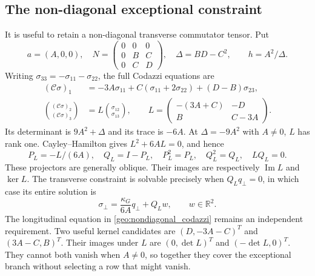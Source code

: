 \subsection{The non-diagonal exceptional constraint}
\label{geo:exceptional_full}
It is useful to retain a non-diagonal transverse commutator tensor. Put
\begin{equation}
 a=(A,0,0),\quad N=\begin{pmatrix}0&0&0\\0&B&C\\0&C&D\end{pmatrix},\quad
 \Delta=BD-C^2,\qquad h=A^2/\Delta.
 \label{geo:nondiagonal_structure}
\end{equation}
Writing $\sigma_{33}=-\sigma_{11}-\sigma_{22}$, the full Codazzi equations are
\begin{align}
 (\mathcal C\sigma)_1&=-3A\sigma_{11}
          +C(\sigma_{11}+2\sigma_{22})+(D-B)\sigma_{23},\nonumber\\
 \binom{(\mathcal C\sigma)_2}{(\mathcal C\sigma)_3}
 &=L\binom{\sigma_{12}}{\sigma_{13}},\qquad
 L=\begin{pmatrix}-(3A+C)&-D\\B&C-3A\end{pmatrix}.
 \label{geo:nondiagonal_codazzi}
\end{align}
Its determinant is $9A^2+\Delta$ and its trace is $-6A$. At $\Delta=-9A^2$ with $A\ne0$, $L$ has rank one. Cayley--Hamilton gives $L^2+6AL=0$, and hence
\begin{equation}
 P_L=-L/(6A),\quad Q_L=I-P_L,\quad
 P_L^2=P_L,\quad Q_L^2=Q_L,\quad LQ_L=0.
 \label{geo:oblique_projectors}
\end{equation}
These projectors are generally oblique. Their images are respectively $\operatorname{Im}L$ and $\ker L$. The transverse constraint is solvable precisely when $Q_Lq_\perp=0$, in which case its entire solution is
\begin{equation}
 \sigma_\perp=\frac{\kappa_G}{6A}q_\perp+Q_Lw,
 \qquad w\in\mathbb R^2.
 \label{geo:oblique_solution}
\end{equation}
The longitudinal equation in \eqref{geo:nondiagonal_codazzi} remains an independent requirement. Two useful kernel candidates are $(D,-3A-C)^T$ and $(3A-C,B)^T$. Their images under $L$ are $(0,\det L)^T$ and $(-\det L,0)^T$. They cannot both vanish when $A\ne0$, so together they cover the exceptional branch without selecting a row that might vanish.

